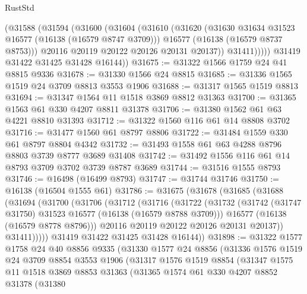\begin{lexlean}{RustStd}
\begin{coremodule}
            (@31588
              (@31594
                (@31600
                  (@31604
                    (@31610
                      (@31620
                        (@31630 @31634 @31523 @16577 (@16138 (@16579 @8747 @3709)))
                        @16577
                        (@16138 (@16579 @8737 @8753)))
                      @20116
                      @20119
                      @20122
                      @20126
                      @20131
                      @20137))
                  @31411)))))
        @31419
        @31422
        @31425
        @31428
        @16144))
@31675 := @31322 @1566 @1759 @24 @41 @8815 @9336
@31678 := @31330 @1566 @24 @8815
@31685 := @31336 @1565 @1519 @24 @3709 @8813 @3553 @1906
@31688 := @31317 @1565 @1519 @8813
@31694 := @31347 @1564 @11 @1518 @3869 @8812 @31363
@31700 := @31365 @1563 @61 @330 @4207 @8811 @31378
@31706 := @31380 @1562 @61 @63 @4221 @8810 @31393
@31712 := @31322 @1560 @116 @61 @14 @8808 @3702
@31716 := @31477 @1560 @61 @8797 @8806
@31722 := @31484 @1559 @330 @61 @8797 @8804 @4342
@31732 := @31493 @1558 @61 @63 @4288 @8796 @8803 @3739 @8777 @3689 @31408
@31742 := @31492 @1556 @116 @61 @14 @8793 @3709 @3702 @3739 @8787 @3689
@31744 := @31516 @1555 @8793
@31746 := @16498 (@16499 @8793)
@31747 := @31744 @31746
@31750 := @16138 (@16504 @1555 @61)
@31786 := @31675
    (@31678
      (@31685
        (@31688
          (@31694
            (@31700
              (@31706
                (@31712
                  (@31716
                    (@31722
                      (@31732
                        (@31742 (@31747 @31750) @31523 @16577 (@16138 (@16579 @8788 @3709)))
                        @16577
                        (@16138 (@16579 @8778 @8796)))
                      @20116
                      @20119
                      @20122
                      @20126
                      @20131
                      @20137))
                  @31411)))))
        @31419
        @31422
        @31425
        @31428
        @16144))
@31898 := @31322
    @1577
    @1758
    @24
    @40
    @8856
    @9335
    (@31330
      @1577
      @24
      @8856
      (@31336
        @1576
        @1519
        @24
        @3709
        @8854
        @3553
        @1906
        (@31317
          @1576
          @1519
          @8854
          (@31347
            @1575
            @11
            @1518
            @3869
            @8853
            @31363
            (@31365
              @1574
              @61
              @330
              @4207
              @8852
              @31378
              (@31380

\end{coremodule}
\end{lexlean}

